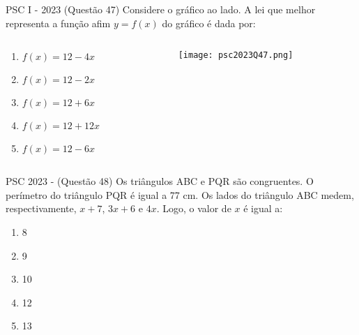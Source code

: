 \documentclass[aspectratio=169]{beamer}
\newif\ifusarcorvermelha
\newcommand{\vermelho}[1]{%
    \ifusarcorvermelha
        {\color{red}#1}%
    \else
        #1%
    \fi
}
\begin{document}
    \begin{frame}{PSC I - 2023 (Questão 47)}
        Considere o gráfico ao lado. A lei que melhor representa a função afim $y=f(x)$ do gráfico é dada por:

        \begin{columns}
            \begin{column}{0.75\textwidth}
                \begin{enumerate}[a]
                    \item $f(x)=12-4x$
                    \item $f(x)=12-2x$
                    \item $f(x)=12+6x$
                    \item $f(x)=12+12x$
                    \item \vermelho{$f(x)=12-6x$}
                \end{enumerate}
            \end{column}

            \begin{column}{0.2\textwidth}
                \texttt{[image: psc2023Q47.png]}
            \end{column}
        \end{columns}
    
    \end{frame}

    \begin{frame}{PSC 2023 - (Questão 48)}
        Os triângulos ABC e PQR são congruentes. O perímetro do triângulo PQR é igual a 77 cm. Os lados do triângulo ABC medem, respectivamente, $x+7$, $3x+6$ e $4x$. Logo, o valor de $x$ é igual a:

            \begin{enumerate}[a]
                \item \vermelho{8} %
                \item 9
                \item 10
                \item 12
                \item 13
            \end{enumerate}
    
    \end{frame}
\end{document}

